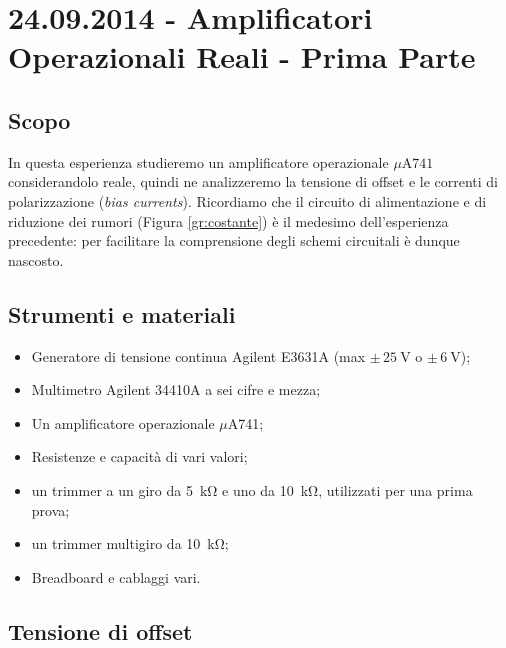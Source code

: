 \section{24.09.2014 - Amplificatori Operazionali Reali - Prima Parte}

\subsection{Scopo}

In questa esperienza studieremo un amplificatore operazionale $\mu$A$741$ considerandolo reale, quindi ne analizzeremo la tensione di offset e le correnti di polarizzazione (\textit{bias currents}).
Ricordiamo che il circuito di alimentazione e di riduzione dei rumori (Figura \ref{gr:costante}) è il medesimo dell'esperienza precedente: per facilitare la comprensione degli schemi circuitali è dunque nascosto.

\subsection{Strumenti e materiali}

\begin{itemize} [noitemsep]
\item Generatore di tensione continua Agilent E3631A (max $\pm \, \SI{25}{\volt}$ o $\pm \, \SI{6}{\volt}$);
\item Multimetro Agilent 34410A a sei cifre e mezza;
\item Un amplificatore operazionale $\mu$A741;
\item Resistenze e capacità di vari valori;
\item un trimmer a un giro da \SI{5}{\kilo\ohm} e uno da \SI{10}{\kilo\ohm}, utilizzati per una prima prova;
\item un trimmer multigiro da \SI{10}{\kilo\ohm};
\item Breadboard e cablaggi vari.
\end{itemize}

\subsection{Tensione di offset}
\label{par2:offset}

